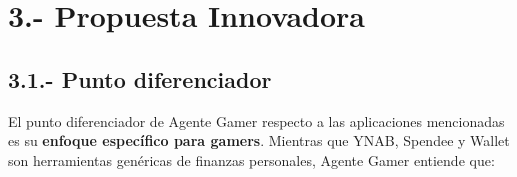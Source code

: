 \documentclass[
  spanish,
  11pt,
  paper=a4,
  ,captions=tableheading
]{scrartcl}
\begin{document}
\newpage

\hypertarget{propuesta-innovadora}{%
\section{3.- Propuesta Innovadora}\label{propuesta-innovadora}}

\hypertarget{punto-diferenciador}{%
\subsection{3.1.- Punto diferenciador}\label{punto-diferenciador}}

El punto diferenciador de Agente Gamer respecto a las aplicaciones
mencionadas es su \textbf{enfoque específico para gamers}. Mientras que
YNAB, Spendee y Wallet son herramientas genéricas de finanzas
personales, Agente Gamer entiende que:
\end{document}
